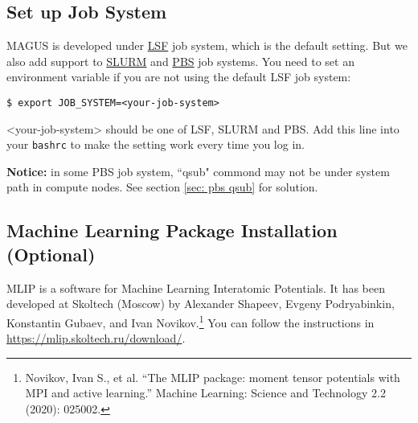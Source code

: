 \documentclass[12pt,oneside]{book}
\newcommand{\file}[1]{\texttt{#1}}
\newcommand{\chref}[3][blue]{\textcolor{#1}{\href{#2}{#3}}} %
\begin{document}
\subsection{Set up Job System}
MAGUS is developed under \chref{https://www.ibm.com/docs/en/spectrum-lsf}{LSF} job system, which is the default setting. But we also add support to \chref{https://slurm.schedmd.com}{SLURM} and \chref{https://www.openpbs.org/}{PBS} job systems. You need to set an environment variable if you are not using the default LSF job system:
\begin{tcolorbox}
    \begin{verbatim}
$ export JOB_SYSTEM=<your-job-system>
    \end{verbatim}
\end{tcolorbox}
<your-job-system> should be one of LSF, SLURM and PBS. Add this line into your \file{bashrc} to make the setting work every time you log in.

\textbf{Notice:} in some PBS job system, ``qsub" commond may not be under system path in compute nodes. See section \ref{sec: pbs qsub} for solution.

\subsection{Machine Learning Package Installation (Optional)}
MLIP is a software for Machine Learning Interatomic Potentials. It has been developed at Skoltech (Moscow) by Alexander Shapeev, Evgeny Podryabinkin, Konstantin Gubaev, and Ivan Novikov.\footnote{Novikov, Ivan S., et al. ``The MLIP package: moment tensor potentials with MPI and active learning.'' Machine Learning: Science and Technology 2.2 (2020): 025002.} You can follow the instructions in \url{https://mlip.skoltech.ru/download/}. 
\end{document}
